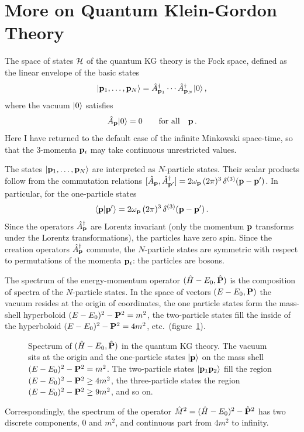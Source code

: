 \section{More on Quantum Klein-Gordon Theory}

The space of states $\mathcal{H}$ of the quantum KG theory is the Fock space, defined
as the linear envelope of the basic states
\[
|\mathbf{p}_1,\dots,\mathbf{p}_N\rangle=\hat A^\dagger_{\mathbf{p}_1}\cdots\hat A^\dagger_{\mathbf{p}_N}|0\rangle\,,
\]
where the vacuum $|0\rangle$ satisfies
\[
\hat A_{\mathbf{p}}|0\rangle=0\qquad\text{for all}\quad\mathbf{p}\,.
\]
Here I have returned to the default case of the infinite Minkowski space-time,
so that the 3-momenta $\mathbf{p}_i$ may take continuous unrestricted values.

The states $|\mathbf{p}_1,\dots,\mathbf{p}_N\rangle$ are interpreted as $N$-particle states.
Their scalar products follow from the commutation relations
$[\hat A_{\mathbf{p}},\hat A^\dagger_{\mathbf{p}'}]=2\omega_{\mathbf{p}}\,(2\pi)^3\,\delta^{(3)}(\mathbf{p}-\mathbf{p}')$.
In particular, for the one-particle states
\[
\langle \mathbf{p}|\mathbf{p}'\rangle=2\omega_{\mathbf{p}}\,(2\pi)^3\,\delta^{(3)}(\mathbf{p}-\mathbf{p}')\,.
\]
Since the operators $\hat A^\dagger_{\mathbf{p}}$ are Lorentz invariant (only the
momentum $\mathbf{p}$ transforms under the Lorentz transformations), the particles
have zero spin. Since the creation operators $\hat A^\dagger_{\mathbf{p}}$ commute, the
$N$-particle states are symmetric with respect to permutations of the momenta
$\mathbf{p}_i$: the particles are bosons.

The spectrum of the energy-momentum operator $(\hat H-E_0,\hat{\mathbf{P}})$ is the
composition of spectra of the $N$-particle states. In the space of vectors
$(E-E_0,\mathbf{P})$ the vacuum resides at the origin of coordinates, the one
particle states form the mass-shell hyperboloid $(E-E_0)^2-\mathbf{P}^2=m^2$, the
two-particle states fill the inside of the hyperboloid
$(E-E_0)^2-\mathbf{P}^2=4m^2$, etc.\ (figure~\ref{fig:spectrum}).
\begin{figure}[ht]
\centering{}
\caption{Spectrum of $(\hat H-E_0,\hat{\mathbf{P}})$ in the quantum KG theory. The
vacuum sits at the origin and the one-particle states $|\mathbf{p}\rangle$ on the mass
shell $(E-E_0)^2-\mathbf{P}^2=m^2$. The two-particle states $|\mathbf{p}_1\mathbf{p}_2\rangle$ fill
the region $(E-E_0)^2-\mathbf{P}^2\ge4m^2$, the three-particle states the region
$(E-E_0)^2-\mathbf{P}^2\ge9m^2$, and so on.}
\label{fig:spectrum}
\end{figure}
Correspondingly, the spectrum of the operator
$\hat M^2=(\hat H-E_0)^2-\hat{\mathbf{P}}^2$ has two discrete components, $0$ and
$m^2$, and continuous part from $4m^2$ to infinity.

